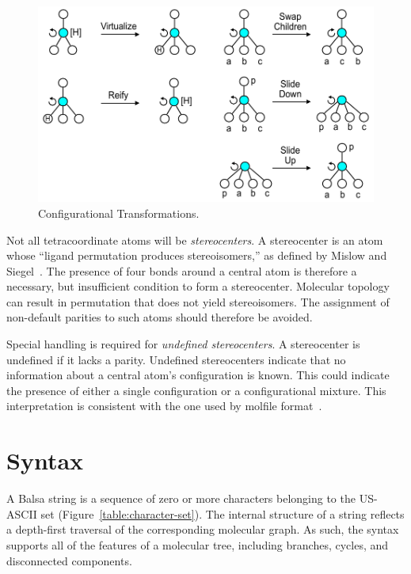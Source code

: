 \documentclass{article}
\begin{document}
\begin{figure}
    \centering
    \includegraphics[width=\columnwidth]{configurational-transformations.pdf}
    \caption{Configurational Transformations.}
    \label{fig:configurational-transformations}
\end{figure}

Not all tetracoordinate atoms will be \textit{stereocenters}. A stereocenter is an atom whose \enquote{ligand permutation produces stereoisomers,} as defined by Mislow and Siegel~\cite{mislow:1984}. The presence of four bonds around a central atom is therefore a necessary, but insufficient condition to form a stereocenter. Molecular topology can result in permutation that does not yield stereoisomers. The assignment of non-default parities to such atoms should therefore be avoided.

Special handling is required for \textit{undefined stereocenters}. A stereocenter is undefined if it lacks a parity. Undefined stereocenters indicate that no information about a central atom's configuration is known. This could indicate the presence of either a single configuration or a configurational mixture. This interpretation is consistent with the one used by molfile format~\cite{ctfileFormats}.

\section*{Syntax}

A Balsa string is a sequence of zero or more characters belonging to the US-ASCII set (Figure~\ref{table:character-set}). The internal structure of a string reflects a depth-first traversal of the corresponding molecular graph. As such, the syntax supports all of the features of a molecular tree, including branches, cycles, and disconnected components.
\end{document}
